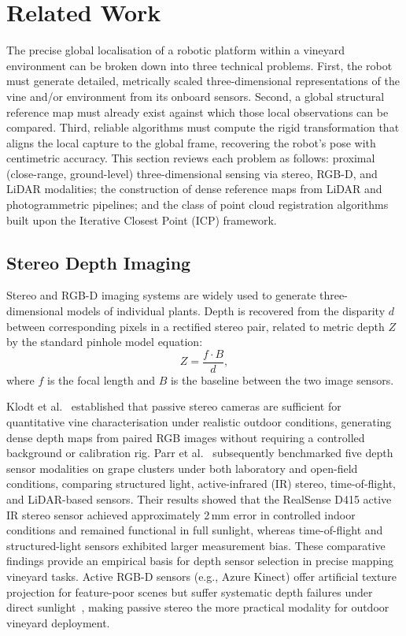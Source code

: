 \section{Related Work}
\label{sec:precise-alignment-related-work}

The precise global localisation of a robotic platform within a vineyard environment can be broken down into three technical problems. First, the robot must generate detailed, metrically scaled three-dimensional representations of the vine and/or environment from its onboard sensors. Second, a global structural reference map must already exist against which those local observations can be compared. Third, reliable algorithms must compute the rigid transformation that aligns the local capture to the global frame, recovering the robot's pose with centimetric accuracy. This section reviews each problem as follows: proximal (close-range, ground-level) three-dimensional sensing via stereo, RGB-D, and LiDAR modalities; the construction of dense reference maps from LiDAR and photogrammetric pipelines; and the class of point cloud registration algorithms built upon the Iterative Closest Point (ICP) framework.

\subsection{Stereo Depth Imaging}
\label{subsec:stereo-depth}

Stereo and RGB-D imaging systems are widely used to generate three-dimensional models of individual plants. Depth is recovered from the disparity $d$ between corresponding pixels in a rectified stereo pair, related to metric depth $Z$ by the standard pinhole model equation:
%
\begin{equation}
    Z = \frac{f \cdot B}{d},
\end{equation}
%
where $f$ is the focal length and $B$ is the baseline between the two image sensors.

Klodt et al.~\cite{klodtFieldPhenotypingGrapevine2015} established that passive stereo cameras are sufficient for quantitative vine characterisation under realistic outdoor conditions, generating dense depth maps from paired RGB images without requiring a controlled background or calibration rig. Parr et al.~\cite{parrAnalysisDepthCameras2022} subsequently benchmarked five depth sensor modalities on grape clusters under both laboratory and open-field conditions, comparing structured light, active-infrared (IR) stereo, time-of-flight, and LiDAR-based sensors. Their results showed that the RealSense D415 active IR stereo sensor achieved approximately 2\,mm error in controlled indoor conditions and remained functional in full sunlight, whereas time-of-flight and structured-light sensors exhibited larger measurement bias. These comparative findings provide an empirical basis for depth sensor selection in precise mapping vineyard tasks. Active RGB-D sensors (e.g., Azure Kinect) offer artificial texture projection for feature-poor scenes but suffer systematic depth failures under direct sunlight~\cite{tolgyessyEvaluationAzureKinect2021}, making passive stereo the more practical modality for outdoor vineyard deployment.

